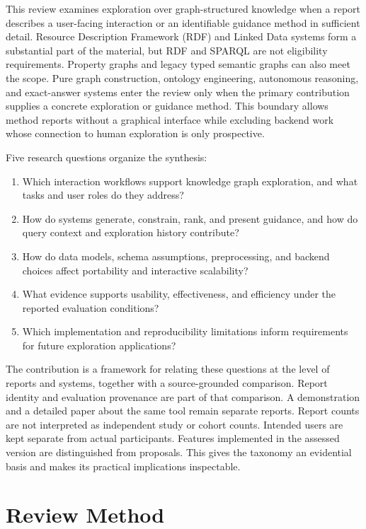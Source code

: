 \documentclass[manuscript,review,screen]{acmart}
\begin{document}
This review examines exploration over graph-structured knowledge when a report describes a user-facing interaction or an identifiable guidance method in sufficient detail. Resource Description Framework (RDF) and Linked Data systems form a substantial part of the material, but RDF and SPARQL are not eligibility requirements. Property graphs and legacy typed semantic graphs can also meet the scope. Pure graph construction, ontology engineering, autonomous reasoning, and exact-answer systems enter the review only when the primary contribution supplies a concrete exploration or guidance method. This boundary allows method reports without a graphical interface while excluding backend work whose connection to human exploration is only prospective.

Five research questions organize the synthesis:
\begin{enumerate}[leftmargin=*,label=\textbf{RQ\arabic*.},topsep=0.2em,itemsep=0.15em,parsep=0pt,midpenalty=10000]
\item Which interaction workflows support knowledge graph exploration, and what tasks and user roles do they address?
\item How do systems generate, constrain, rank, and present guidance, and how do query context and exploration history contribute?
\item How do data models, schema assumptions, preprocessing, and backend choices affect portability and interactive scalability?
\item What evidence supports usability, effectiveness, and efficiency under the reported evaluation conditions?
\item Which implementation and reproducibility limitations inform requirements for future exploration applications?
\end{enumerate}

The contribution is a framework for relating these questions at the level of reports and systems, together with a source-grounded comparison. Report identity and evaluation provenance are part of that comparison. A demonstration and a detailed paper about the same tool remain separate reports. Report counts are not interpreted as independent study or cohort counts. Intended users are kept separate from actual participants. Features implemented in the assessed version are distinguished from proposals. This gives the taxonomy an evidential basis and makes its practical implications inspectable.

\section{Review Method}
\end{document}
